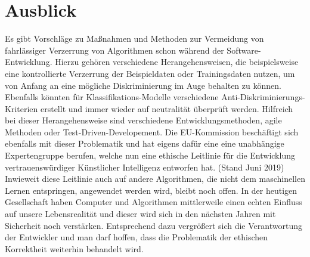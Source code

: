 \section{Ausblick}
Es gibt Vorschläge zu Maßnahmen und Methoden zur Vermeidung von fahrlässiger Verzerrung von Algorithmen schon während der Software-Entwicklung. Hierzu gehören verschiedene Herangehensweisen, die beispielsweise eine kontrollierte Verzerrung der Beispieldaten oder Trainingsdaten nutzen, um von Anfang an eine mögliche Diskriminierung im Auge behalten zu können. Ebenfalls könnten für Klassifikations-Modelle verschiedene Anti-Diskriminierungs-Kriterien erstellt und immer wieder auf neutralität überprüft werden. Hilfreich bei dieser Herangehensweise sind verschiedene Entwicklungsmethoden, agile Methoden oder Test-Driven-Developement. \newline 
Die EU-Kommission beschäftigt sich ebenfalls mit dieser Problematik und hat eigens dafür eine eine unabhängige Expertengruppe berufen, welche nun eine ethische Leitlinie für die Entwicklung vertrauenswürdiger Künstlicher Intelligenz entworfen hat. (Stand Juni 2019) \cite{europe2019} Inwieweit diese Leitlinie auch auf andere Algorithmen, die nicht dem maschinellen Lernen entspringen, angewendet werden wird, bleibt noch offen. 
\newline
In der heutigen Gesellschaft haben Computer und Algorithmen mittlerweile einen echten Einfluss auf unsere Lebensrealität und dieser wird sich in den nächsten Jahren mit Sicherheit noch verstärken. Entsprechend dazu vergrößert sich die Verantwortung der Entwickler und man darf hoffen, dass die Problematik der ethischen Korrektheit weiterhin behandelt wird.


